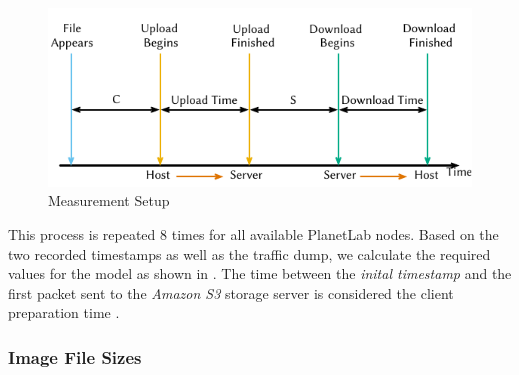 \begin{figure}
  \includegraphics{application/cloud_file_synchronization/application_measurements/figures/measurement_setup}
  \caption{Measurement Setup}
  \label{fig:application:cloud_file_synchronisation:application_measurements:bandwidth_preparation_times:measurement_setup}
\end{figure}

This process is repeated \(8\) times for all available PlanetLab nodes.
Based on the two recorded timestamps as well as the traffic dump, we calculate the required values for the model as shown in .
The time between the \emph{inital timestamp} and the first packet sent to the \emph{Amazon S3} storage server is considered the client preparation time \clientpreparationtime.

\subsubsection*{Image File Sizes}\label{sec:application:cloud_file_synchronisation:application_measurements:image_file_sizes}

